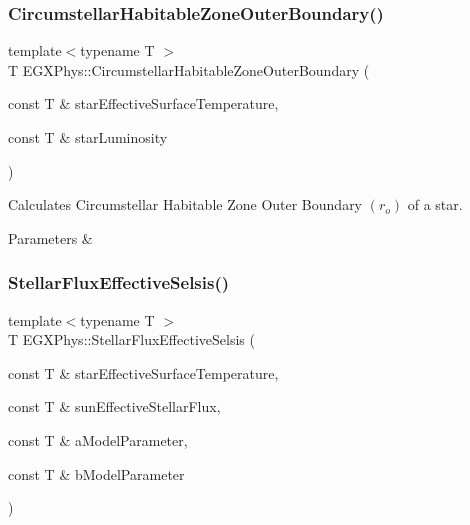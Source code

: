 \subsubsection{\texorpdfstring{Circumstellar\+Habitable\+Zone\+Outer\+Boundary()}{CircumstellarHabitableZoneOuterBoundary()}}
{\footnotesize\ttfamily template$<$typename T $>$ \\
T E\+G\+X\+Phys\+::\+Circumstellar\+Habitable\+Zone\+Outer\+Boundary (\begin{DoxyParamCaption}\item[{const T \&}]{star\+Effective\+Surface\+Temperature,  }\item[{const T \&}]{star\+Luminosity }\end{DoxyParamCaption})}



Calculates Circumstellar Habitable Zone Outer Boundary $(r_o)$ of a star. 


\begin{DoxyParams}{Parameters}
{\em } & \\
\hline
\end{DoxyParams}
\mbox{\label{group___e_g_x_phys-_circumstellar_habitable_zone_limit_ga3ce3a04fec7b1c8fb66ac54270ce3902}} 
\subsubsection{\texorpdfstring{Stellar\+Flux\+Effective\+Selsis()}{StellarFluxEffectiveSelsis()}}
{\footnotesize\ttfamily template$<$typename T $>$ \\
T E\+G\+X\+Phys\+::\+Stellar\+Flux\+Effective\+Selsis (\begin{DoxyParamCaption}\item[{const T \&}]{star\+Effective\+Surface\+Temperature,  }\item[{const T \&}]{sun\+Effective\+Stellar\+Flux,  }\item[{const T \&}]{a\+Model\+Parameter,  }\item[{const T \&}]{b\+Model\+Parameter }\end{DoxyParamCaption})}



